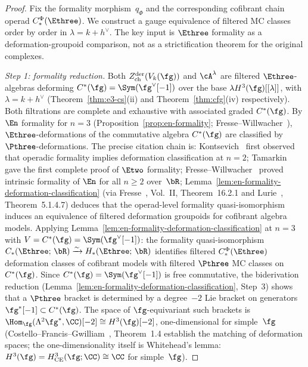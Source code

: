 \begin{proof}
Fix the formality morphism~$q_\Phi$ and the corresponding cofibrant
chain operad $C_*^\Phi(\Ethree)$. We construct a gauge equivalence
of filtered MC classes order by order in
$\lambda=k+h^\vee$. The key input is $\Ethree$ formality as a
deformation-groupoid comparison, not as a strictification theorem for
the original complexes.

\smallskip
\noindent\textit{Step 1: formality reduction.}
Both $Z^{\mathrm{der}}_{\mathrm{ch}}(V_k(\fg))$ and
$\cA^\lambda$ are filtered $\Ethree$-algebras deforming
$C^*(\fg) = \Sym(\fg^\vee[-1])$ over the base
$\lambda H^3(\fg)[[\lambda]]$, with $\lambda = k + h^\vee$
(Theorem~\ref{thm:e3-cs}(ii) and
Theorem~\ref{thm:cfg}(iv) respectively).
Both filtrations are complete and exhaustive with
associated graded $C^*(\fg)$.
By $\En$ formality for $n = 3$
(Proposition~\ref{prop:en-formality};
Fresse--Willwacher~\cite{FresseWillwacher20}),
$\Ethree$-deformations of the commutative algebra
$C^*(\fg)$ are classified by $\Pthree$-deformations.
The precise citation chain is:
Kontsevich~\cite{Kon99} first observed
that operadic formality implies deformation classification
at $n = 2$;
Tamarkin~\cite{Tamarkin03} gave the first complete proof
of $\Etwo$ formality;
Fresse--Willwacher~\cite{FresseWillwacher20} proved
intrinsic formality of $\En$ for all $n \geq 2$ over~$\bR$;
Lemma~\ref{lem:en-formality-deformation-classification}
(via Fresse~\cite{Fresse17}, Vol.~II, Theorem~16.2.1 and
Lurie~\cite{HA}, Theorem~5.1.4.7)
 deduces that the operad-level formality quasi-isomorphism induces an
equivalence of filtered deformation groupoids for cofibrant algebra
models.
Applying Lemma~\ref{lem:en-formality-deformation-classification}
at $n = 3$ with $V = C^*(\fg) = \Sym(\fg^\vee[-1])$:
the formality quasi-isomorphism
$C_*(\Ethree;\, \bR) \xrightarrow{\sim}
H_*(\Ethree;\, \bR)$
identifies filtered $C_*^\Phi(\Ethree)$ deformation classes of
cofibrant models with filtered $\Pthree$ MC classes on
$C^*(\fg)$.
Since $C^*(\fg) = \Sym(\fg^\vee[-1])$ is free commutative,
the biderivation reduction
(Lemma~\ref{lem:en-formality-deformation-classification},
Step~3) shows that a $\Pthree$ bracket is determined by a
degree~$-2$ Lie bracket on generators
$\fg^*[-1] \subset C^*(\fg)$.
The space of $\fg$-equivariant such brackets is
$\Hom_\fg(\Lambda^2\fg^*, \CC)[-2] \cong H^3(\fg)[-2]$,
one-dimensional for simple~$\fg$
(Costello--Francis--Gwilliam~\cite{CFG25}, Theorem~1.4
establish the matching of deformation spaces; the
one-dimensionality itself is Whitehead's lemma:
$H^3(\fg) = H^3_{\mathrm{CE}}(\fg; \CC) \cong \CC$
for simple~$\fg$).


\end{proof}
